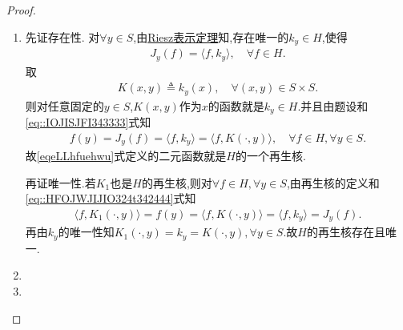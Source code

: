 \documentclass[../../main.tex]{subfiles}%
\begin{document}
\begin{proof}
\begin{enumerate}[(1)]
\item 先证存在性.
对$\forall y\in S$,由\hyperref[theorem:Riesz表示定理(Hilbert空间)]{Riesz表示定理}知,存在唯一的$k_y\in H$,使得
\begin{align}\label{eq::IOJISJFI343333}
J_y(f) = \langle f,k_y\rangle,\quad \forall f\in H.
\end{align}
取
\begin{align}
K(x,y) \triangleq k_y(x),\quad \forall (x,y)\in S\times S.\label{eqeLLhfuehwu}
\end{align}
则对任意固定的$y\in S$,$K(x,y)$作为$x$的函数就是$k_y\in H$.并且由题设和\eqref{eq::IOJISJFI343333}式知
\begin{align}\label{eq::HFOJWJIJIO324t342444}
f(y) = J_y(f) = \langle f,k_y \rangle = \langle f,K(\cdot ,y) \rangle,\quad \forall f\in H,\forall y\in S.
\end{align}
故\eqref{eqeLLhfuehwu}式定义的二元函数就是$H$的一个再生核.

再证唯一性.若$K_1$也是$H$的再生核,则对$\forall f\in H,\forall y\in S$,由再生核的定义和\eqref{eq::HFOJWJIJIO324t342444}式知
\begin{align*}
\langle f,K_1(\cdot,y)\rangle =f(y) = \langle f,K(\cdot,y)\rangle = \langle f,k_y\rangle = J_y(f).
\end{align*}
再由$k_y$的唯一性知$K_1(\cdot,y)=k_y=K(\cdot,y),\forall y\in S.$故$H$的再生核存在且唯一.

\item 

\item 
\end{enumerate}
\end{proof}
\end{document}
